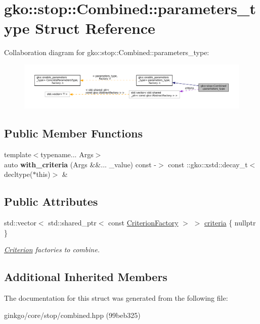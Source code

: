 \hypertarget{structgko_1_1stop_1_1Combined_1_1parameters__type}{}\section{gko\+:\+:stop\+:\+:Combined\+:\+:parameters\+\_\+type Struct Reference}
\label{structgko_1_1stop_1_1Combined_1_1parameters__type}


Collaboration diagram for gko\+:\+:stop\+:\+:Combined\+:\+:parameters\+\_\+type\+:
\nopagebreak
\begin{figure}[H]
\begin{center}
\leavevmode
\includegraphics[width=350pt]{structgko_1_1stop_1_1Combined_1_1parameters__type__coll__graph}
\end{center}
\end{figure}
\subsection*{Public Member Functions}
\begin{DoxyCompactItemize}
\item 
\mbox{\label{structgko_1_1stop_1_1Combined_1_1parameters__type_ae9e759fd53bb4bef3e8899a5bb462eec}} 
{\footnotesize template$<$typename... Args$>$ }\\auto {\bfseries with\+\_\+criteria} (Args \&\&... \+\_\+value) const -\/$>$ const \+::gko\+::xstd\+::decay\+\_\+t$<$ decltype($\ast$this)$>$ \&
\end{DoxyCompactItemize}
\subsection*{Public Attributes}
\begin{DoxyCompactItemize}
\item 
\mbox{\label{structgko_1_1stop_1_1Combined_1_1parameters__type_a2ab63880c1758c42b3a175cd6b004635}} 
std\+::vector$<$ std\+::shared\+\_\+ptr$<$ const \hyperlink{group__stop_gab12a51109c50b35ec36dc5a393d6a9a0}{Criterion\+Factory} $>$ $>$ \hyperlink{structgko_1_1stop_1_1Combined_1_1parameters__type_a2ab63880c1758c42b3a175cd6b004635}{criteria} \{ nullptr \}
\begin{DoxyCompactList}\small\item\em \hyperlink{classgko_1_1stop_1_1Criterion}{Criterion} factories to combine. \end{DoxyCompactList}\end{DoxyCompactItemize}
\subsection*{Additional Inherited Members}


The documentation for this struct was generated from the following file\+:\begin{DoxyCompactItemize}
\item 
ginkgo/core/stop/combined.\+hpp (99beb325)\end{DoxyCompactItemize}
